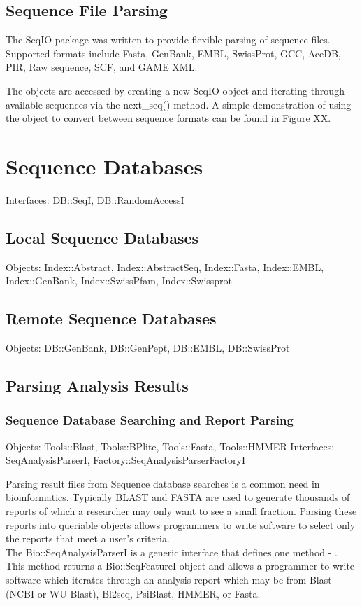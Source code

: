 \documentclass{article}
\begin{document}
\begin{twocolumn}
\subsection{Sequence File Parsing}

The SeqIO package was written to provide flexible parsing of sequence
files.  Supported formats include Fasta, GenBank, EMBL, SwissProt,
GCC, AceDB, PIR, Raw sequence, SCF, and GAME XML. 

The objects are accessed by creating a new SeqIO object and iterating
through available sequences via the next\_seq() method.  A simple
demonstration of using the object to convert between sequence formats
can be found in Figure XX.



\section{Sequence Databases}

Interfaces: DB::SeqI, DB::RandomAccessI

\subsection{Local Sequence Databases}
Objects: Index::Abstract, Index::AbstractSeq, Index::Fasta,
Index::EMBL, Index::GenBank, Index::SwissPfam, Index::Swissprot

\subsection{Remote Sequence Databases}

Objects: DB::GenBank, DB::GenPept, DB::EMBL, DB::SwissProt

\subsection{Parsing Analysis Results}

\subsubsection{Sequence Database Searching and Report Parsing}

Objects: Tools::Blast, Tools::BPlite, Tools::Fasta,
Tools::HMMER
Interfaces: SeqAnalysisParserI, Factory::SeqAnalysisParserFactoryI

Parsing result files from Sequence database searches is a common need
in bioinformatics.  Typically BLAST and FASTA are used to generate
thousands of reports of which a researcher may only want to see a
small fraction.  Parsing these reports into queriable objects allows
programmers to write software to select only the reports that meet a
user's criteria.
\\
The Bio::SeqAnalysisParserI is a generic interface that defines one
method - .  This method returns a Bio::SeqFeatureI object
and allows a programmer to write software which iterates through an
analysis report which may be from Blast (NCBI or WU-Blast), Bl2seq,
PsiBlast, HMMER, or Fasta. 

\end{twocolumn}
\end{document}
